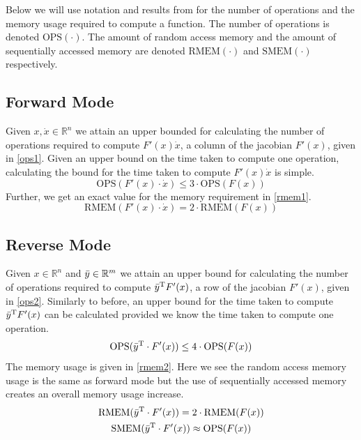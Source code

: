 \documentclass{article}
\begin{document}
Below we will use notation and results from \cite{dhamarticle} for the number of operations and the memory usage required to compute a function. The number of operations is denoted $\text{OPS}(\cdot)$. The amount of random access memory and the amount of sequentially accessed memory are denoted $\text{RMEM}(\cdot)$ and $\text{SMEM}(\cdot)$ respectively. 

\subsection{Forward Mode}

Given $x, \Dot{x} \in \mathbb{R}^n$ we attain an upper bounded for calculating the number of operations required to compute $F'(x) \Dot{x}$, a column of the jacobian $F'(x)$, given in \eqref{ops1}. Given an upper bound on the time taken to compute one operation, calculating the bound for the time taken to compute $F'(x)\Dot{x}$ is simple.
\begin{equation} \label{ops1}
    \text{OPS}(F'(x) \cdot \Dot{x}) \leq 3 \cdot \text{OPS}(F(x))
\end{equation}
Further, we get an exact value for the memory requirement in \eqref{rmem1}.
\begin{equation} \label{rmem1}
    \text{RMEM}(F'(x) \cdot \Dot{x}) = 2 \cdot \text{RMEM}(F(x))
\end{equation}

\subsection{Reverse Mode}

Given $x \in \mathbb{R}^n$ and $\Bar{y} \in \mathbb{R}^m$ we attain an upper bound for calculating the number of operations required to compute $\Bar{y}^\text{T} F'(x)$, a row of the jacobian $F'(x)$, given in \eqref{ops2}. Similarly to before, an upper bound for the time taken to compute $\Bar{y}^\text{T} F'(x)$ can be calculated provided we know the time taken to compute one operation.
\begin{equation} \label{ops2}
    \text{OPS}(\Bar{y}^\text{T} \cdot F'(x)) \leq 4 \cdot \text{OPS}(F(x))
\end{equation}
The memory usage is given in \eqref{rmem2}. Here we see the random access memory usage is the same as forward mode but the use of sequentially accessed memory creates an overall memory usage increase.
\begin{equation} \label{rmem2}
    \begin{gathered}
        \text{RMEM}(\Bar{y}^\text{T} \cdot F'(x)) = 2 \cdot \text{RMEM}(F(x)) \\ 
        \text{SMEM}(\Bar{y}^\text{T} \cdot F'(x)) \approx \text{OPS}(F(x))
    \end{gathered}
\end{equation}
\end{document}
